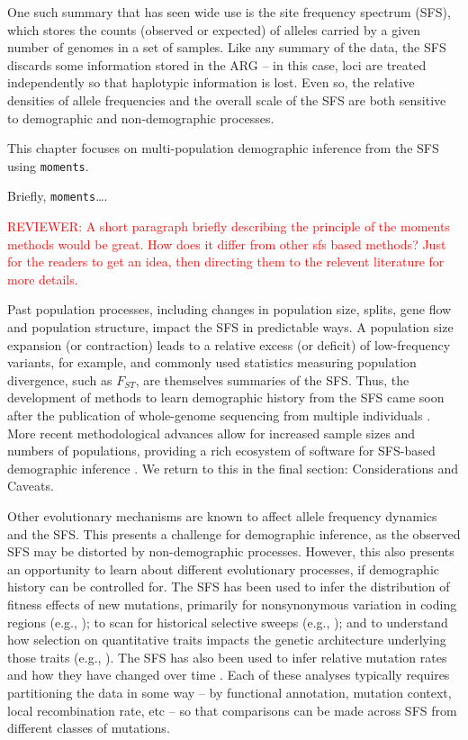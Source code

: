 \documentclass[]{article}
\newcommand{\reviewercomment}[1]{{\textcolor{red}{REVIEWER: #1}}}
\newcommand{\moments}{\texttt{moments}\xspace}
\begin{document}
One such summary that has seen wide use is the site frequency spectrum (SFS),
which stores the counts (observed or expected) of alleles carried by a given
number of genomes in a set of samples. Like any summary of the data, the SFS
discards some information stored in the ARG -- in this case, loci are treated
independently so that haplotypic information is lost. Even so, the relative
densities of allele frequencies and the overall scale of the SFS are both
sensitive to demographic and non-demographic processes.

This chapter focuses on multi-population demographic inference from the SFS
using \moments \cite{jouganous2017inferring}.

Briefly, \moments \ldots. 

\reviewercomment{A short paragraph
    briefly describing the principle of the moments methods would be great. How
    does it differ from other sfs based methods? Just for the readers to get an
idea, then directing them to the relevent literature for more details.}


Past population processes, including changes in population size, splits, gene flow
and population structure, impact the SFS in predictable ways. A population size
expansion (or contraction) leads to a relative excess (or deficit) of
low-frequency variants, for example, and commonly used statistics measuring
population divergence, such as $F_{ST}$, are themselves summaries of the SFS.
Thus, the development of methods to learn demographic history from the SFS came
soon after the publication of whole-genome sequencing from multiple individuals
\cite{marth2004allele, williamson2005simultaneous}. More recent methodological
advances allow for increased sample sizes and numbers of populations, providing
a rich ecosystem of software for SFS-based demographic inference
\cite{gutenkunst2009inferring, excoffier2011fastsimcoal,
    gravel2011demographic, jouganous2017inferring, ragsdale2018genomic,
kamm2020efficiently, dilber2024faster}. We return to this in the final section:
Considerations and Caveats.

Other evolutionary mechanisms are known to affect allele frequency dynamics and
the SFS. This presents a challenge for demographic inference, as the observed
SFS may be distorted by non-demographic processes. However, this also presents
an opportunity to learn about different evolutionary processes, if demographic
history can be controlled for. The SFS has been used to infer the distribution
of fitness effects of new mutations, primarily for nonsynonymous variation in
coding regions (e.g., \cite{eyre2006distribution, boyko2008assessing,
kim2017inference}); to scan for historical selective sweeps
(e.g., \cite{kim2002detecting, nielsen2005genomic}); and to understand how
selection on quantitative traits impacts the genetic architecture underlying
those traits (e.g., \cite{patel2024conditional, ragsdale2024archaic}). The SFS
has also been used to infer relative mutation rates and how they have changed
over time \cite{dewitt2021nonparametric}. Each of these analyses typically
requires partitioning the data in some way -- by functional annotation,
mutation context, local recombination rate, etc -- so that comparisons can be
made across SFS from different classes of mutations.
\end{document}
